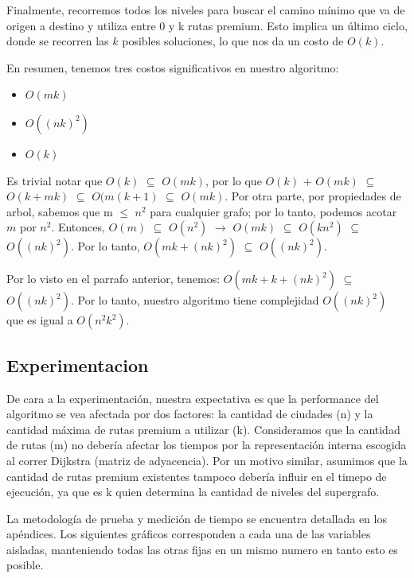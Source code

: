 Finalmente, recorremos todos los niveles para buscar el camino mínimo que va de origen a destino y utiliza entre 0 y k rutas premium. Esto implica un último ciclo, donde se recorren las $k$ posibles soluciones, lo que nos da un costo de $O(k)$.

En resumen, tenemos tres costos significativos en nuestro algoritmo:

\begin{itemize}
	\item $O(mk)$

	\item $O((nk)^2)$

	\item $O(k)$
\end{itemize}

Es trivial notar que $O(k)$ $\subseteq$ $O(mk)$, por lo que $O(k)$ + $O(mk)$ $\subseteq$ $O(k + mk)$ $\subseteq$ $O(m(k+1)$ $\subseteq$ $O(mk)$. Por otra parte, por propiedades de arbol, sabemos que m $\leq$ $n^2$ para cualquier grafo; por lo tanto, podemos acotar $m$ por $n^2$. Entonces, $O(m)$ $\subseteq$ $O(n^2)$ $\rightarrow$ $O(mk)$ $\subseteq$ $O(kn^2)$ $\subseteq$ $O((nk)^2)$. Por lo tanto, $O(mk + (nk)^2)$ $\subseteq$ $O((nk)^2)$.

Por lo visto en el parrafo anterior, tenemos: $O(mk + k + (nk)^2)$ $\subseteq$ $O((nk)^2)$. Por lo tanto, nuestro algoritmo tiene complejidad $O((nk)^2)$ que es igual a $O(n^2k^2)$.

\subsection{Experimentacion}

De cara a la experimentación, nuestra expectativa es que la performance del algoritmo se vea afectada por dos factores: la cantidad de ciudades (n) y la cantidad máxima de rutas premium a utilizar (k). Consideramos que la cantidad de rutas (m) no debería afectar los tiempos por la representación interna escogida al correr Dijkstra (matriz de adyacencia). Por un motivo similar, asumimos que la cantidad de rutas premium existentes tampoco debería influir en el timepo de ejecución, ya que es k quien determina la cantidad de niveles del supergrafo.

La metodología de prueba y medición de tiempo se encuentra detallada en los apéndices. Los siguientes gráficos corresponden a cada una de las variables aisladas, manteniendo todas las otras fijas en un mismo numero en tanto esto es posible.

